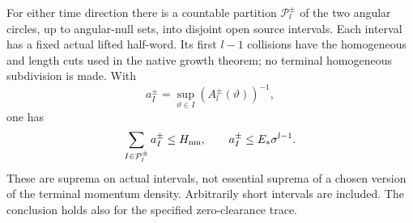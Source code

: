 \begin{theorem}
\label{thm:mb-branch-sup}
For either time direction there is a countable partition
$\mathcal P_l^\pm$ of the two angular circles, up to angular-null
sets, into disjoint open source intervals.  Each interval has a
fixed actual lifted half-word.  Its first $l-1$ collisions have
the homogeneous and length cuts used in the native growth theorem;
no terminal homogeneous subdivision is made.  With
\[
 a_I^\pm=\sup_{\vartheta\in I}(A_l^\pm(\vartheta))^{-1},
\]
one has
\begin{equation}\label{eq:mb-one-sided}
 \sum_{I\in\mathcal P_l^\pm}a_I^\pm\le H_{\rm nm},
 \qquad
 a_I^\pm\le E_*\sigma^{l-1}.
\end{equation}
These are suprema on actual intervals, not essential suprema of a
chosen version of the terminal momentum density.  Arbitrarily short
intervals are included.  The conclusion holds also for the specified
zero-clearance trace.
\end{theorem}
